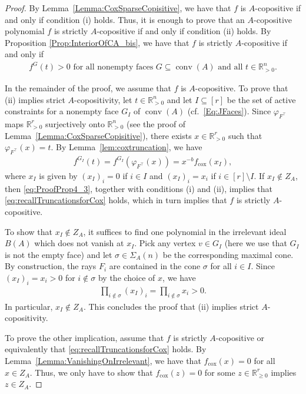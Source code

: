 \documentclass[10pt,a4paper]{amsart}
\DeclareMathOperator{\conv}{conv}
\newcommand{\RR}{\mathbb{R}}
\newcommand{\cox}{\mathrm{cox}}
\begin{document}
\begin{proof}
By Lemma~\ref{Lemma:CoxSparseCopisitive}, we have that $f$ is $A$-copositive if and only if condition (i) holds. 
Thus, it is enough to prove that an $A$-copositive polynomial $f$ is strictly $A$-copositive if and only if condition (ii) holds. By Proposition \ref{Prop:InteriorOfCA_bis}, we have that $f$ is strictly $A$-copositive if and only if 
\begin{align}
\label{eq:recallTruncationsforCox}
f^{G}(t)>0\text{ for all nonempty faces }G \subseteq \conv(A) \text{ and all }t\in\RR_{>0}^n.
    \end{align}


In the remainder of the proof, we assume that $f$ is $A$-copositive.
To prove that (ii) implies strict $A$-copositivity, let $t \in \RR^n_{>0}$ and let $I \subseteq [r]$ be the set of active constraints for a nonempty face $G_I$ of $\conv(A)$  (cf.~\eqref{Eq:JFaces}).
Since $\varphi_{F^\top}$ maps $\RR_{>0}^r$ surjectively onto $\RR_{>0}^n$ (see the proof of Lemma~\ref{Lemma:CoxSparseCopisitive}), there exists $x\in \RR_{>0}^r$ such that $\varphi_{F^\top}(x)=t$.
By Lemma~\ref{lem:coxtruncation}, we have
\begin{align}
\label{eq:ProofProp4_3}
          f^{G_I}(t)=f^{G_I}(\varphi_{F^\top}(x))=x^{-b}f_{\cox}(x_I),
        \end{align}
        where $x_I$ is given by
        $(x_I)_i = 0$ if $i\in I$  and $(x_I)_i = x_i$ if $i \in [r] \setminus I$.
If $x_I \notin Z_A$, then \eqref{eq:ProofProp4_3}, together with conditions (i) and (ii), implies that \eqref{eq:recallTruncationsforCox} holds, which in turn implies that $f$ is strictly $A$-copositive.

To show that $x_I\notin Z_A$, it suffices to find one polynomial in the irrelevant ideal $B(A)$ which does not vanish at $x_I$. Pick any vertex $v\in G_I$ (here we use that $G_I$ is not the empty face) and let $\sigma \in \Sigma_A(n)$ be the corresponding maximal cone.
By construction, the rays $F_i$ are contained in the cone $\sigma$ for all $i \in I$.
Since $(x_I)_i = x_i > 0$ for $i  \notin \sigma$ by the choice of $x$, we have
\begin{align*}
        \prod_{i\notin \sigma}(x_I)_i=\prod_{i\notin \sigma}x_i>0.
    \end{align*}
    In particular, $x_I\notin Z_A$. This concludes the proof that (ii) implies strict $A$-copositivity.
    
     To prove the other implication, assume that $f$ is strictly $A$-copositive or equivalently that \eqref{eq:recallTruncationsforCox} holds.
     By Lemma~\ref{Lemma:VanishingOnIrrelevant}, we have that $f_\cox(x) = 0$ for all $x \in Z_A$.
     Thus, we only have to show that $f_\cox(z)=0$ for some $z\in \RR_{\geq 0}^r$ implies $z\in Z_A$. 


\end{proof}
\end{document}
